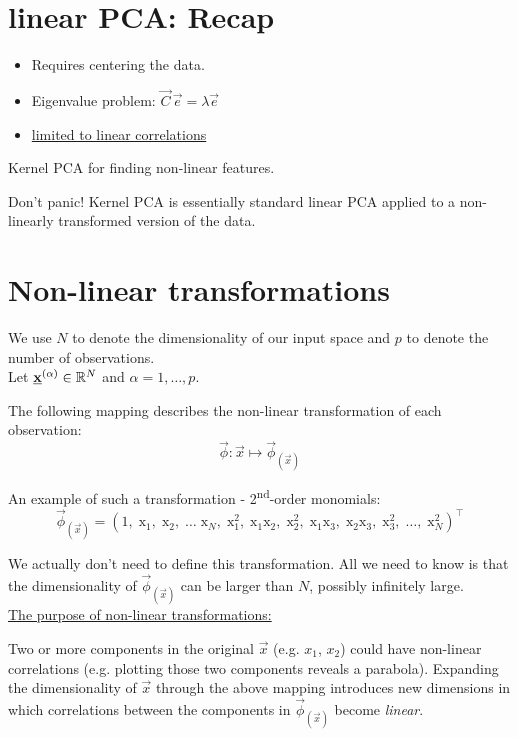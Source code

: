 
\section{linear PCA: Recap}
\begin{itemize}
\item Requires centering the data.
\item Eigenvalue problem: $\vec C\,\vec e = \lambda \vec e$
\item \underline{limited to linear correlations}
\end{itemize}

Kernel PCA for finding non-linear features.

Don't panic! Kernel PCA is essentially standard linear PCA applied to a non-linearly transformed version of the data.

\section{Non-linear transformations}

We use $N$ to denote the dimensionality of our input space and $p$ to denote the number of observations.\\
Let $\underline{\mathbf{x}}^{(\alpha)} \in \mathbb{R}^N$ and $\alpha = 1, \ldots, p$.

The following mapping describes the non-linear transformation of each observation:
$$
\vec{\phi}: \vec{x} \mapsto \vec{\phi}_{(\vec{x})}
$$

An example of such a transformation - 2\textsuperscript{nd}-order monomials:
$$
\vec{\phi}_{(\vec{x})} = ( 
    1, \;
    \mathrm{x}_1, \;
    \mathrm{x}_2, \;
    \ldots \;
    \mathrm{x}_N, \;
    \mathrm{x}_1^2, \; 
    \mathrm{x}_1 \mathrm{x}_2, \;
    \mathrm{x}_2^2, \;
    \mathrm{x}_1 \mathrm{x}_3, \;
    \mathrm{x}_2 \mathrm{x}_3, \;
    \mathrm{x}_3^2, \; \ldots, \;
    \mathrm{x}_N^2
    )^\top
$$

We actually don't need to define this transformation.
All we need to know is that the dimensionality of $\vec{\phi}_{(\vec{x})}$ can be larger than $N$, possibly infinitely large.\\

\underline{The purpose of non-linear transformations:}

Two or more components in the original $\vec x$ (e.g. $x_1$, $x_2$) could have non-linear correlations (e.g. plotting those two components reveals a parabola). 
Expanding the dimensionality of $\vec x$ through the above mapping introduces new dimensions in which correlations between the components in $\vec \phi_{(\vec x)}$ become \emph{linear}.

